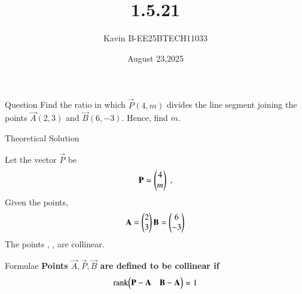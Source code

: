 \documentclass{beamer}
\begin{document}
\title 
{1.5.21}
\date{August 23,2025}


\author 
{Kavin B-EE25BTECH11033}






\frame{\titlepage}
\begin{frame}{Question}
Find the ratio in which $\vec{P}(4,m)$ divides the line segment joining the points $\vec{A}(2,3)$ and $\vec{B}(6,-3)$. Hence, find $m$.
\end{frame}



\begin{frame}{Theoretical Solution}

Let the vector $\vec{P}$ be 
\begin{align}
    \vec{P}=\begin{myvec}{4\\m}\end{myvec} \;, 
\end{align}
Given the points,
\begin{align}
    \vec{A}=\begin{myvec}{2\\3}\end{myvec}
    \vec{B}=\begin{myvec}{6\\-3}\end{myvec}
\end{align}
The points , ,  are collinear.\\

\end{frame}

\begin{frame}{Formulae}
\textbf{Points $\vec{A}, \vec{P}, \vec{B}$ are defined to be collinear if }
\begin{align}
		\label{eq:line-rank-2}
		\text{rank}{\ensuremath{\begin{pmatrix}\mathbf{P}-\mathbf{A}& \mathbf{B}-\mathbf{A}\end{pmatrix}}} = 1
\end{align}
\end{frame}
\end{document}
